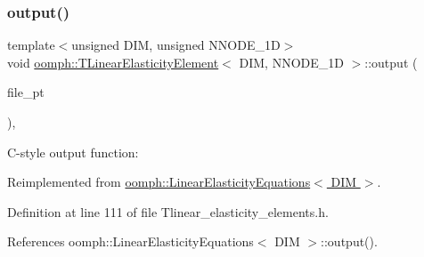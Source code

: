 \mbox{\label{classoomph_1_1TLinearElasticityElement_adc8c188c039e833bfab31aa3b127b3f7}} 
\subsubsection{\texorpdfstring{output()}{output()}\hspace{0.1cm}{\footnotesize\ttfamily [3/4]}}
{\footnotesize\ttfamily template$<$unsigned D\+IM, unsigned N\+N\+O\+D\+E\+\_\+1D$>$ \\
void \hyperlink{classoomph_1_1TLinearElasticityElement}{oomph\+::\+T\+Linear\+Elasticity\+Element}$<$ D\+IM, N\+N\+O\+D\+E\+\_\+1D $>$\+::output (\begin{DoxyParamCaption}\item[{F\+I\+LE $\ast$}]{file\+\_\+pt }\end{DoxyParamCaption})\hspace{0.3cm}{\ttfamily [inline]}, {\ttfamily [virtual]}}



C-\/style output function\+: 



Reimplemented from \hyperlink{classoomph_1_1LinearElasticityEquations_a5ece3b89bf886d39782820e449a4edaa}{oomph\+::\+Linear\+Elasticity\+Equations$<$ D\+I\+M $>$}.



Definition at line 111 of file Tlinear\+\_\+elasticity\+\_\+elements.\+h.



References oomph\+::\+Linear\+Elasticity\+Equations$<$ D\+I\+M $>$\+::output().

\mbox{\label{classoomph_1_1TLinearElasticityElement_ab819534efce64389b6e06bc90acefc86}} 
